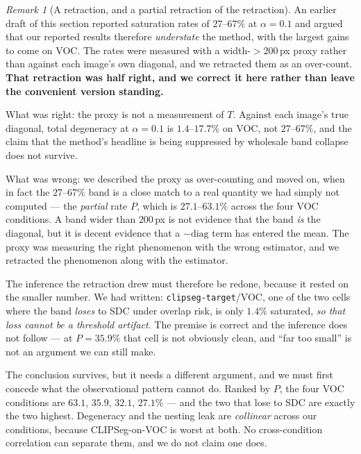 \documentclass[11pt]{article}
\theoremstyle{remark}
\newtheorem{remark}{Remark}
\newcommand{\diag}{\mathrm{diag}}
\begin{document}
\begin{remark}[A retraction, and a partial retraction of the retraction]\label{rem:retraction}
An earlier draft of this section reported saturation rates of $27$--$67\%$ at
$\alpha=0.1$ and argued that our reported results therefore \emph{understate} the
method, with the largest gains to come on VOC. The rates were measured with a
width-$>200$\,px proxy rather than against each image's own diagonal, and we
retracted them as an over-count. \textbf{That retraction was half right, and we
correct it here rather than leave the convenient version standing.}

What was right: the proxy is not a measurement of $T$. Against each image's true
diagonal, total degeneracy at $\alpha=0.1$ is $1.4$--$17.7\%$ on VOC, not
$27$--$67\%$, and the claim that the method's headline is being suppressed by
wholesale band collapse does not survive.

What was wrong: we described the proxy as over-counting and moved on, when in fact
the $27$--$67\%$ band is a close match to a real quantity we had simply not
computed --- the \emph{partial} rate $P$, which is $27.1$--$63.1\%$ across the four
VOC conditions. A band wider than $200$\,px is not evidence that the band \emph{is}
the diagonal, but it is decent evidence that a $-\diag$ term has entered the mean.
The proxy was measuring the right phenomenon with the wrong estimator, and we
retracted the phenomenon along with the estimator.

The inference the retraction drew must therefore be redone, because it rested on
the smaller number. We had written: \texttt{clipseg-target}/VOC, one of the two
cells where the band \emph{loses} to SDC under overlap risk, is only $1.4\%$
saturated, \emph{so that loss cannot be a threshold artifact}. The premise is
correct and the inference does not follow --- at $P = 35.9\%$ that cell is not
obviously clean, and ``far too small'' is not an argument we can still make.

The conclusion survives, but it needs a different argument, and we must first concede
what the observational pattern cannot do. Ranked by $P$, the four VOC conditions are
$63.1$, $35.9$, $32.1$, $27.1\%$ --- and the two that lose to SDC are exactly the two
highest. Degeneracy and the nesting leak are \emph{collinear} across our conditions,
because CLIPSeg-on-VOC is worst at both. No cross-condition correlation can separate
them, and we do not claim one does.


\end{remark}
\end{document}
